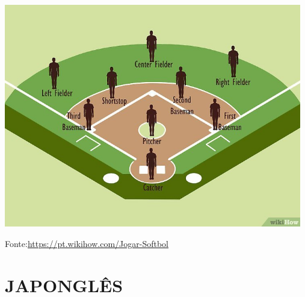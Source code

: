 	\includegraphics[width=130mm]{fig/v4-728px-Play-Softball-Step-4-Version-3}
	\par Fonte:\url{https://pt.wikihow.com/Jogar-Softbol}

\chapter{JAPONGLÊS}


